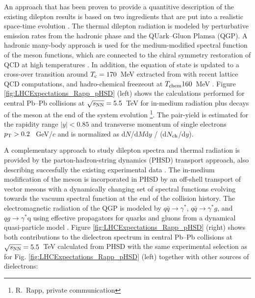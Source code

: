 \documentclass[../report.tex]{subfiles}
\begin{document}
An approach that has been proven to provide a quantitive description of the existing dilepton results \cite{Rapp:2011is}  is based on two ingredients that are put into a realistic space-time evolution \cite{Rapp:2000pe}. The thermal dilepton radiation is modeled by perturbative emission rates from the hadronic phase and the QUark--Gluon Plamsa (QGP)\cite{vanHees:2007th,Rapp:2009yu}. A hadronic many-body approach \cite{Rapp:1999us} is used for the medium-modified spectral function of the \Prho meson functions, which are connected to the chiral symmetry restoration of QCD at high temperatures \cite{Hohler:2013eba}. In addition, the equation of state is updated to a cross-over transition around $T_{\rm c}=170$~MeV extracted from with recent lattice QCD computations, and hadro-chemical freezeout at $T_{\rm chem}160$~MeV \cite{He:2011zx}. Figure \ref{fig:LHCExpectations_Rapp_pHSD} (left) shows the calculations performed for central Pb--Pb collisions at $\sqrt{s_{\rm NN}}= 5.5$~TeV for in-medium radiation plus decays of the \Prho meson at the end of the system evolution \footnote{R.~Rapp, private communication}. The pair-yield is estimated for the rapidity range $|y|<0.85$ and transverse momentum of single electrons $p_{\rm T}>0.2$~ GeV/$c$ and is normalized as d$N$/d$M$d$y$ / (d$N_{\rm ch}$/d$y$). 
 
A complementary approach to study dilepton spectra and thermal radiation is provided by the parton-hadron-string dynamics (PHSD) transport approach, also describing succesfully the existing experimental data \cite{Linnyk:2015rco,Cassing:2009vt}. The in-medium modification of the \Prho meson is incorporated in PHSD by an off-shell transport of vector mesons with a dynamically changing set of spectral functions \cite{Bratkovskaya:2007jk} evolving towards the vacuum spectral function at the end of the collision history. The electromagnetic radiation of the QGP is modeled by $q\bar{q}\rightarrow\gamma^{*}$, $q\bar{q}\rightarrow\gamma^{*}g$, and $qg\rightarrow\gamma^{*}$q using effective propagators for quarks and gluons from a dynamical quasi-particle model \cite{Linnyk:2010vb}. Figure \ref{fig:LHCExpectations_Rapp_pHSD} (right) shows both contributions to the dielectron spectrum in central Pb--Pb collisions at $\sqrt{s_{\rm NN}}= 5.5$~TeV calculated from PHSD with the same experimental selection as for Fig. \ref{fig:LHCExpectations_Rapp_pHSD} (left) together with other sources of dielectrons:  
\end{document}
